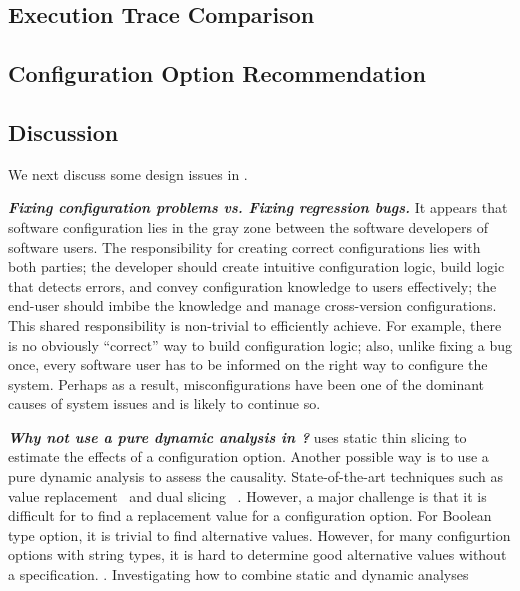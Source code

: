 

\subsection{Execution Trace Comparison}
\label{sec:comparison}



\subsection{Configuration Option Recommendation}
\label{sec:rootcause}



\subsection{Discussion}

We next discuss some design issues in \ourtool.

\vspace{1mm}

\noindent \textbf{\textit{Fixing configuration problems vs. Fixing regression bugs.}}
It appears that software configuration lies in the gray zone between
the software developers of software users.
The responsibility for creating correct configurations
lies with both parties; the developer should create
intuitive configuration logic, build logic that detects
errors, and convey configuration knowledge to users
effectively;  the end-user should imbibe the
knowledge and manage cross-version configurations.
This shared responsibility is non-trivial to efficiently
achieve. For example, there is no obviously ``correct'' way to
build configuration logic; also, unlike fixing a bug once,
every software user has to be informed on the right way to
configure the system. Perhaps as a result, misconfigurations
have been one of the dominant causes of system issues and
is likely to continue so.


\vspace{1mm}
\noindent \textbf{\textit{Why not use a pure dynamic analysis in \ourtool?}}
\ourtool uses static thin slicing to estimate the effects of
a configuration option. Another possible way is to use a pure
dynamic analysis to assess the causality. State-of-the-art
techniques such as value replacement~\cite{} and dual slicing~\cite{}
.
However, a major challenge is that it is difficult for
\ourtool to find a replacement value for a configuration option.
For Boolean type option, it is trivial to find alternative values.
However, for many configurtion options with string types, it
is hard to determine good alternative values without a specification.
. Investigating how
to combine static and dynamic analyses 


